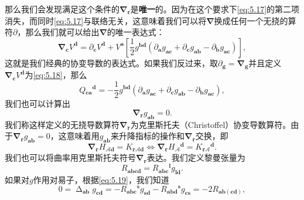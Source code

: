 那么我们会发现满足这个条件的$\boldsymbol{\nabla }_{\boldsymbol{r}}$是\textbf{唯一}的。因为在这个要求下\ref{eq:5.17}的第二项消失，而同时\ref{eq:5.17}与联络无关，这意味着我们可以将$\boldsymbol{\nabla }$换成任何一个无挠的算符$\partial $，那么我们就可以给出$\boldsymbol{\nabla }$的唯一表达式：
\begin{equation}
	\boldsymbol{\nabla }_{\boldsymbol{c}} V^{\boldsymbol{d}} =\partial _{\boldsymbol{c}} V^{\boldsymbol{d}} +V^{\boldsymbol{a}}\left[\frac{1}{2} g^{\boldsymbol{bd}}( \partial _{\boldsymbol{a}} g_{\boldsymbol{ac}} +\partial _{\boldsymbol{c}} g_{\boldsymbol{ab}} -\partial _{\boldsymbol{b}} g_{\boldsymbol{ac}})\right] ,
	\label{eq:5.18}
\end{equation}
这就是我们经典的协变导数的表达式。如果我们反过来，取$\partial _{\boldsymbol{g}} =\tilde{\boldsymbol{\nabla }}_{\boldsymbol{g}}$并且定义$\boldsymbol{\nabla }_{\boldsymbol{c}} V^{\boldsymbol{d}}$为\ref{eq:5.18}，那么
\begin{equation*}
	Q{_{\boldsymbol{ca}}}^{\boldsymbol{d}} =-\frac{1}{2} g^{\boldsymbol{bd}}( \partial _{\boldsymbol{a}} g_{\boldsymbol{ac}} +\partial _{\boldsymbol{c}} g_{\boldsymbol{ab}} -\partial _{\boldsymbol{b}} g_{\boldsymbol{ac}}) ,
\end{equation*}
我们也可以计算出
\begin{equation}
	\boldsymbol{\nabla }_{\boldsymbol{r}} g_{\boldsymbol{ab}} =0.
	\label{eq:5.19}
\end{equation}
我们称这样定义的无挠导数算符$\boldsymbol{\nabla }_{\boldsymbol{r}}$为克里斯托夫（Christoffel）协变导数算符。由于$\boldsymbol{\nabla }_{\boldsymbol{r}} g_{\boldsymbol{ab}} =0$，这意味着用$g_{\boldsymbol{ab}}$来升降指标的操作和$\boldsymbol{\nabla }_{\boldsymbol{r}}$交换，即
\begin{equation*}
	\boldsymbol{\nabla }_{\boldsymbol{r}} H_{\mathcal{A}\boldsymbol{d}} =K_{\boldsymbol{r}\mathcal{A}\boldsymbol{d}} \Leftrightarrow \boldsymbol{\nabla }_{\boldsymbol{r}} H{_{\mathcal{A}}}^{\boldsymbol{d}} =K{_{\boldsymbol{r}\mathcal{A}}}^{\boldsymbol{d}} .
\end{equation*}
我们也可以将曲率用克里斯托夫符号$\boldsymbol{\nabla }_{\boldsymbol{r}}$表达。我们定义黎曼张量为
\begin{equation*}
	R_{\boldsymbol{abcd}} =R{_{\boldsymbol{abc}}}^{\boldsymbol{l}} g_{\boldsymbol{ld}} .
\end{equation*}
如果对$g$作用对易子，根据\ref{eq:5.19}，我们知道
\begin{equation*}
	0=\upDelta _{\boldsymbol{ab}} g_{\boldsymbol{cd}} =-R{_{\boldsymbol{abc}}}^{\boldsymbol{s}} g_{\boldsymbol{sd}} -R{_{\boldsymbol{abd}}}^{\boldsymbol{s}} g_{\boldsymbol{cs}} =-2R_{\boldsymbol{ab}(\boldsymbol{cd})} ,
\end{equation*}
